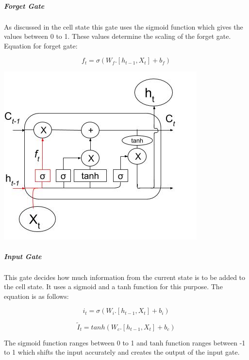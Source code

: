 \subparagraph{Forget Gate}

As discussed in the cell state this gate uses the sigmoid function which gives the values between 0 to 1. These values determine the scaling of the forget gate.
Equation for forget gate:

\begin{equation}
	f_{t} = \sigma (W_{f} . [h_{t-1}, X_{t}] + b_{f})	
\end{equation}

				\begin{center}
				\includegraphics[width=\linewidth]{figures/Forget-gate.jpg}	
				\label{fig: Forget Gate}
				\end{center}

\subparagraph{Input Gate}

This gate decides how much information from the current state is to be added to the cell state. It uses a sigmoid and a tanh function for this purpose. The equation is as follows:

\begin{equation}
	i_{t} = \sigma (W_{i} . [h_{t-1}, X_{t}] + b_{i})
\end{equation}

\begin{equation}
	\tilde{I}_{t} = tanh (W_{c} . [h_{t-1}, X_{t}] + b_{c})	
\end{equation}


The sigmoid function ranges between 0 to 1 and tanh function ranges between -1 to 1 which shifts the input accurately and creates the output of the input gate.

